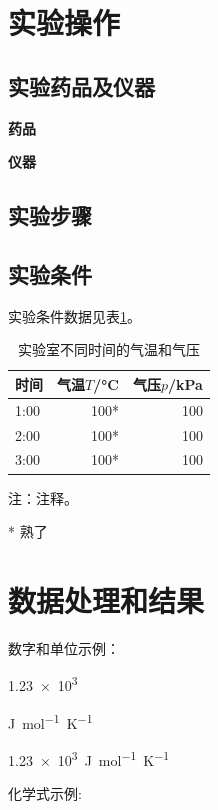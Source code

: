 \documentclass[UTF8]{article}
\begin{document}
	\section{实验操作}
	\subsection{实验药品及仪器}
	\textbf{药品} 
	
	\textbf{仪器} 
	
	\subsection{实验步骤}
	
	\subsection{实验条件}
	实验条件数据见表\ref{tiaojian}。
	
	\begin{table}[htp]
		\centering
		\begin{threeparttable}
			\caption{实验室不同时间的气温和气压}\label{tiaojian}
			\small %
			\begin{tabular} {lrr}
				\toprule
				时间 & 气温$T$/\si{\degreeCelsius} & 气压$p$/\si{kPa}  \\
				\midrule
				1:00 & 100* & 100 \\
				2:00 & 100* & 100 \\
				3:00 & 100* & 100 \\
				\bottomrule
			\end{tabular}
		注：注释。
		\begin{tablenotes}
			\item[*] 熟了
		\end{tablenotes}
		\end{threeparttable}
	\end{table}
	
	
	\section{数据处理和结果}
	
	数字和单位示例：
	
	\num{1.23e3}
	
	\si{J.mol^{-1}.K^{-1}}
	
	\SI{1.23e3}{J.mol^{-1}.K^{-1}}
	
	化学式示例:
	
	
\end{document}
